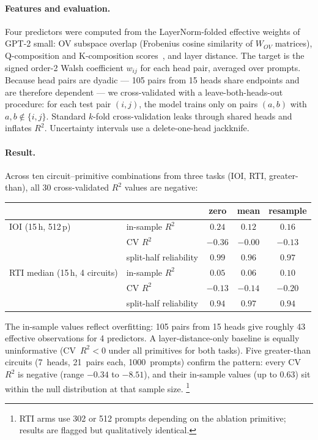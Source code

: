 \documentclass{article}
\begin{document}
\paragraph{Features and evaluation.}

Four predictors were computed from the LayerNorm-folded effective
weights of GPT-2 small: OV subspace overlap (Frobenius cosine similarity
of $W_{OV}$ matrices), Q-composition and K-composition
scores~\citep{elhage2021mathematical}, and layer distance. The target is
the signed order-2 Walsh coefficient $w_{ij}$ for each head pair, averaged
over prompts. Because head pairs are dyadic --- 105 pairs from 15 heads
share endpoints and are therefore dependent --- we cross-validated with a
leave-both-heads-out procedure: for each test pair $(i,j)$, the model
trains only on pairs $(a,b)$ with $a,b \notin \{i,j\}$. Standard
$k$-fold cross-validation leaks through shared heads and inflates
$R^2$. Uncertainty intervals use a delete-one-head jackknife.

\paragraph{Result.}

Across ten circuit--primitive combinations from three tasks (IOI, RTI,
greater-than), all 30 cross-validated $R^2$ values are negative:

\medskip

\begin{tabular}{llccc}
\toprule
 & & zero & mean & resample \\
\midrule
IOI (15\,h, 512\,p)
 & in-sample $R^2$ & $0.24$ & $0.12$ & $0.16$ \\
 & CV $R^2$ & $-0.36$ & $-0.00$ & $-0.13$ \\
 & split-half reliability & $0.99$ & $0.96$ & $0.97$ \\
\midrule
RTI median (15\,h, 4 circuits)
 & in-sample $R^2$ & $0.05$ & $0.06$ & $0.10$ \\
 & CV $R^2$ & $-0.13$ & $-0.14$ & $-0.20$ \\
 & split-half reliability & $0.94$ & $0.97$ & $0.94$ \\
\bottomrule
\end{tabular}

\medskip

\noindent The in-sample values reflect overfitting: 105 pairs from 15 heads
give roughly 43 effective observations for 4 predictors. A
layer-distance-only baseline is equally uninformative (CV~$R^2 < 0$ under
all primitives for both tasks). Five greater-than circuits (7~heads,
21~pairs each, 1000~prompts) confirm the pattern: every CV~$R^2$ is
negative (range $-0.34$ to $-8.51$), and their in-sample values (up to
$0.63$) sit within the null distribution at that sample size.%
\footnote{RTI arms use 302 or 512 prompts depending on the ablation
primitive; results are flagged but qualitatively identical.}
\end{document}
